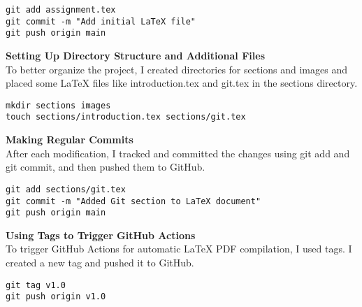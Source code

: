 \documentclass{article}
\begin{document}
\begin{verbatim}
git add assignment.tex
git commit -m "Add initial LaTeX file"
git push origin main
\end{verbatim}

\textbf{Setting Up Directory Structure and Additional Files} \\
To better organize the project, I created directories for sections and images and placed some LaTeX files like introduction.tex and git.tex in the sections directory.

\begin{verbatim}
mkdir sections images
touch sections/introduction.tex sections/git.tex
\end{verbatim}

\textbf{Making Regular Commits} \\
After each modification, I tracked and committed the changes using git add and git commit, and then pushed them to GitHub.

\begin{verbatim}
git add sections/git.tex
git commit -m "Added Git section to LaTeX document"
git push origin main
\end{verbatim}

\textbf{Using Tags to Trigger GitHub Actions} \\
To trigger GitHub Actions for automatic LaTeX PDF compilation, I used tags. I created a new tag and pushed it to GitHub.

\begin{verbatim}
git tag v1.0
git push origin v1.0
\end{verbatim}
\end{document}

